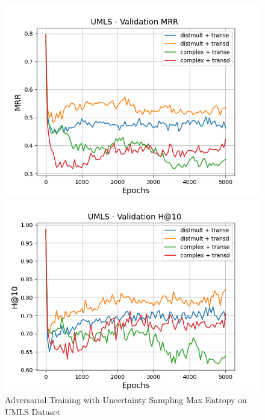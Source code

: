 \begin{figure}
\begin{minipage}{.5\textwidth}
      \includegraphics[width=0.9\linewidth]{figures/results/gan_train/pretrained/uncertainty/max/entropy/umls/gan_train_uncertainty_umls_mrrs.png}
    \end{minipage}%
    \begin{minipage}{.5\textwidth}
      \centering
      \includegraphics[width=0.9\linewidth]{figures/results/gan_train/pretrained/uncertainty/max/entropy/umls/gan_train_uncertainty_umls_hit10s.png}
    \end{minipage}%
    \caption{Adversarial Training with Uncertainty Sampling Max Entropy on \textsc{UMLS} Dataset}
    \label{fig:test}
\end{figure}


\pagebreak


